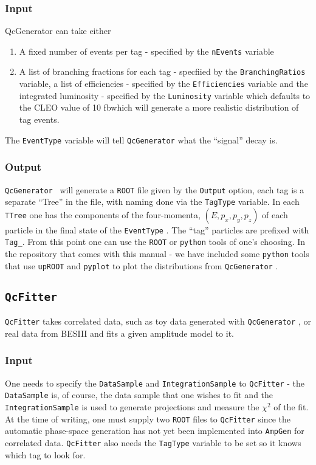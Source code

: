 \documentclass{article}
\newcommand{\AmpGen}{\texttt{AmpGen} }
\newcommand{\QcGenerator}{\texttt{QcGenerator} }
\newcommand{\QcFitter}{\texttt{QcFitter} }
\newcommand{\EventType}{\texttt{EventType} }
\newcommand{\TagType}{\texttt{TagType} }
\newcommand{\DataSample}{\texttt{DataSample} }
\newcommand{\IntegrationSample}{\texttt{IntegrationSample} }
\newcommand{\Output}{\texttt{Output} }
\newcommand{\python}{\texttt{python} }
\newcommand{\ROOT}{\texttt{ROOT} }
\newcommand{\fb}{\si{\femto\barn}}
\begin{document}
\subsubsection{Input}
QcGenerator can take either
\begin{enumerate}
    \item A fixed number of events per tag - specified by the \texttt{nEvents} variable
    \item A list of branching fractions for each tag - specfiied by the \texttt{BranchingRatios} variable, a list of efficiencies - specified by the \texttt{Efficiencies} variable and the integrated luminosity - specified by the \texttt{Luminosity} variable which defaults to the CLEO value of 10 \fb which will generate a more realistic distribution of tag events. 
\end{enumerate}

The \texttt{EventType} variable will tell \texttt{QcGenerator} what the ``signal'' decay is. 
\subsubsection{Output}
\QcGenerator\  will generate a \ROOT  file given by the \Output  option, each tag is a separate ``Tree'' in the file, with naming done via the \TagType  variable. 
In each \texttt{TTree} one has the components of the four-momenta, $(E, p_x, p_y, p_z)$ of each particle in the final state of the \EventType. The ``tag'' particles are prefixed with \texttt{Tag\_}. From this point one can use the \ROOT  or \python  tools of one's choosing. 
In the repository that comes with this manual - we have included some \python tools that use \texttt{upROOT} and \texttt{pyplot} to plot the distributions from \QcGenerator.
\subsection{\QcFitter}
\QcFitter  takes correlated data, such as toy data generated with \QcGenerator, or real data from BESIII and fits a given amplitude model to it.
\subsubsection{Input}
One needs to specify the \DataSample  and \IntegrationSample  to \QcFitter  - the \DataSample  is, of course, the data sample that one wishes to fit and the \IntegrationSample  is used to generate projections and measure the $\chi^2$ of the fit. At the time of writing, one must supply two \ROOT files to \QcFitter since the automatic phase-space generation has not yet been implemented into \AmpGen for correlated data. 
\QcFitter also needs the \TagType variable to be set so it knows which tag to look for. 
\end{document}
